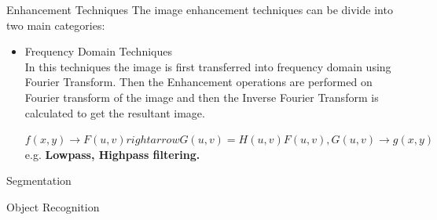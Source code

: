 \documentclass[12pt]{beamer}
\begin{document}
\begin{frame}{Enhancement Techniques}
\large The image enhancement techniques can be divide into two main categories:
\normalsize
{}
 {
\begin{itemize}
\item<2> Frequency Domain Techniques \\
In this techniques the image is first transferred into frequency domain using Fourier Transform. Then the Enhancement operations are performed on Fourier transform of the image and then the Inverse Fourier Transform is calculated to get the resultant image.

$f(x,y) \rightarrow F(u,v) rightarrow G(u,v) = H(u,v)F(u,v), G(u,v) \rightarrow g(x,y) $ \\
e.g. \textbf{Lowpass, Highpass filtering.}
\end{itemize}
}
\end{frame}
\begin{frame}{Segmentation}

\end{frame}

\begin{frame}{Object Recognition}

\end{frame}
\end{document}
